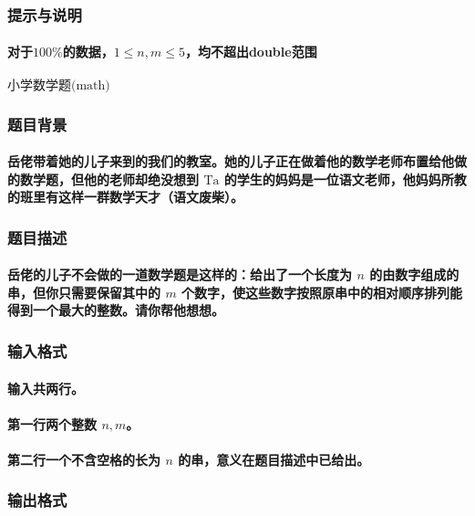 \documentclass[final,11pt,oneside,UTF8]{report}
\begin{document}
\subsubsection{提示与说明}
\paragraph{对于$100\%$的数据，$1\leq n,m\leq 5$，均不超出double范围}
\newpage

\centerline{\LARGE{$\textbf{小学数学题}\text{(math)}$}}
\subsubsection{题目背景}
\paragraph{
    岳佬带着她的儿子来到的我们的教室。她的儿子正在做着他的数学老师布置给他做的数学题，但他的老师却绝没想到 $\text{Ta}$ 的学生的妈妈是一位语文老师，他妈妈所教的班里有这样一群数学天才（语文废柴）。
}
\subsubsection{题目描述}
\paragraph{
    岳佬的儿子不会做的一道数学题是这样的：给出了一个长度为 $n$ 的由数字组成的串，但你只需要保留其中的 $m$ 个数字，使这些数字按照原串中的相对顺序排列能得到一个最大的整数。请你帮他想想。
}
\subsubsection{输入格式}
\paragraph{输入共两行。}
\paragraph{第一行两个整数 $n,m$。}
\paragraph{第二行一个不含空格的长为 $n$ 的串，意义在题目描述中已给出。}
\subsubsection{输出格式}
\end{document}
